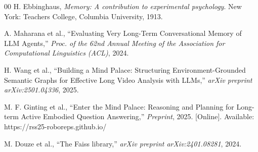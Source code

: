 \documentclass[conference]{IEEEtran}
\begin{document}
\begin{thebibliography}{00}
 H. Ebbinghaus, \textit{Memory: A contribution to experimental psychology}. New York: Teachers College, Columbia University, 1913.

 A. Maharana et al., ``Evaluating Very Long-Term Conversational Memory of LLM Agents,'' \textit{Proc. of the 62nd Annual Meeting of the Association for Computational Linguistics (ACL)}, 2024.

 H. Wang et al., ``Building a Mind Palace: Structuring Environment-Grounded Semantic Graphs for Effective Long Video Analysis with LLMs,'' \textit{arXiv preprint arXiv:2501.04336}, 2025.

 M. F. Ginting et al., ``Enter the Mind Palace: Reasoning and Planning for Long-term Active Embodied Question Answering,'' \textit{Preprint}, 2025. [Online]. Available: https://rss25-roboreps.github.io/

 M. Douze et al., ``The Faiss library,'' \textit{arXiv preprint arXiv:2401.08281}, 2024.

\end{thebibliography}
\end{document}
